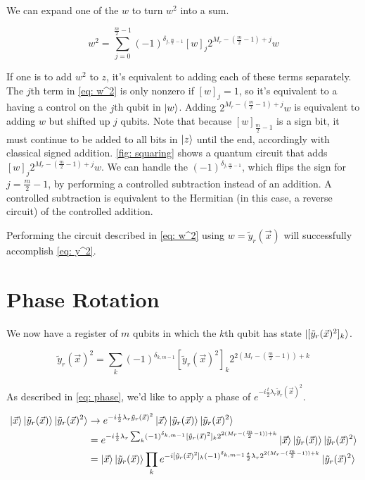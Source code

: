 We can expand one of the $w$ to turn $w^2$ into a sum.

\begin{equation}
    w^2 = \sum_{j = 0}^{\frac{m}{2} - 1} (-1)^{\delta_{j, \frac{m}{2} - 1}}[w]_j2^{M_r - (\frac{m}{2} - 1) + j}w \label{eq: w^2}
\end{equation}

If one is to add $w^2$ to $z$, it's equivalent to adding each of these terms separately. The $j$th term in \eqref{eq: w^2} is only nonzero if $[w]_j = 1$, so it's equivalent to a having a control on the $j$th qubit in $\ket{w}$. Adding $2^{M_r - (\frac{m}{2} - 1) + j}w$ is equivalent to adding $w$ but shifted up $j$ qubits. Note that because $[w]_{\frac{m}{2} - 1}$ is a sign bit, it must continue to be added to all bits in $\ket{z}$ until the end, accordingly with classical signed addition. \ref{fig: squaring} shows a quantum circuit that adds $[w]_j2^{M_r - (\frac{m}{2} - 1) + j}w$.
We can handle the $(-1)^{\delta_{j, \frac{m}{2} - 1}}$, which flips the sign for $j = \frac{m}{2} - 1$, by performing a controlled subtraction instead of an addition. A controlled subtraction is equivalent to the Hermitian (in this case, a reverse circuit) of the controlled addition.

Performing the circuit described in \ref{eq: w^2} using $w = \tilde{y}_r(\vec{x})$ will successfully accomplish \ref{eq: y^2}.

\section{Phase Rotation}

We now have a register of $m$ qubits in which the $k$th qubit has state $\ket{[\tilde{y}_r(\vec{x})^2]_k}$.

\begin{equation}
    \tilde{y}_r(\vec{x})^2 = \sum_k (-1)^{\delta_{k, m - 1}}[\tilde{y}_r(\vec{x})^2]_k2^{2(M_r - (\frac{m}{2} - 1)) + k}
\end{equation}

As described in \eqref{eq: phase}, we'd like to apply a phase of $e^{-i\frac{t}{2}\lambda_r\tilde{y}_r(\vec{x})^2}$.

\begin{equation}
    \begin{split}
        \ket{\vec{x}}\ket{\tilde{y}_r(\vec{x})}\ket{\tilde{y}_r(\vec{x})^2} &\rightarrow e^{-i\frac{t}{2}\lambda_r\tilde{y}_r(\vec{x})^2}\ket{\vec{x}}\ket{\tilde{y}_r(\vec{x})}\ket{\tilde{y}_r(\vec{x})^2} \\
        &= e^{-i\frac{t}{2}\lambda_r\sum_k (-1)^{\delta_{k, m - 1}}[\tilde{y}_r(\vec{x})^2]_k2^{2(M_r - (\frac{m}{2} - 1)) + k}}\ket{\vec{x}}\ket{\tilde{y}_r(\vec{x})}\ket{\tilde{y}_r(\vec{x})^2}\\
        &= \ket{\vec{x}}\ket{\tilde{y}_r(\vec{x})}\prod_k e^{-i[\tilde{y}_r(\vec{x})^2]_k(-1)^{\delta_{k, m - 1}}\frac{t}{2}\lambda_r2^{2(M_r - (\frac{m}{2} - 1)) + k}}\ket{\tilde{y}_r(\vec{x})^2}
    \end{split}
\end{equation}

